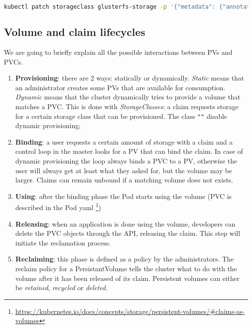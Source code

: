 \begin{lstlisting}[language=bash]
kubectl patch storageclass glusterfs-storage -p '{"metadata": {"annotations":{"storageclass.kubernetes.io/is-default-class":"true"}}}'
\end{lstlisting}

\subsection{Volume and claim lifecycles}
\label{lifecycle}

We are going to briefly explain all the possible interactions between PVs and
PVCs.

\begin{enumerate}
\item \textbf{Provisioning}: there are 2 ways: statically or dynamically.
  \emph{Static} means that an administrator creates some PVs that are available
  for consumption. \emph{Dynamic} means that the cluster dynamically tries to
  provide a volume that matches a PVC. This is done with \emph{StorageClasses}:
  a claim requests storage for a certain storage class that can be provisioned.
  The class \texttt{""} disable dynamic provisioning;
\item \textbf{Binding}: a user requests a certain amount of storage with a claim
  and a control loop in the master looks for a PV that can bind the claim. In
  case of dynamic provisioning the loop always binds a PVC to a PV, otherwise
  the user will always get at least what they asked for, but the volume may be
  larger. Claims can remain unbound if a matching volume does not exists.
\item \textbf{Using}: after the binding phase the Pod starts using the volume
  (PVC is described in the Pod yaml
  \footnote{\url{https://kubernetes.io/docs/concepts/storage/persistent-volumes/\#claims-as-volumes}})
\item \textbf{Releasing}: when an application is done using the volume,
  developers can delete the PVC objects through the API, releasing the claim.
  This step will initiate the reclamation process.
\item \textbf{Reclaiming}: this phase is defined as a policy by the
  administrators. The reclaim policy for a PersistantVolume tells the cluster
  what to do with the volume after it has been released of its claim. Persistent
  volumes can either be \emph{retained}, \emph{recycled} or \emph{deleted}.
\end{enumerate}

